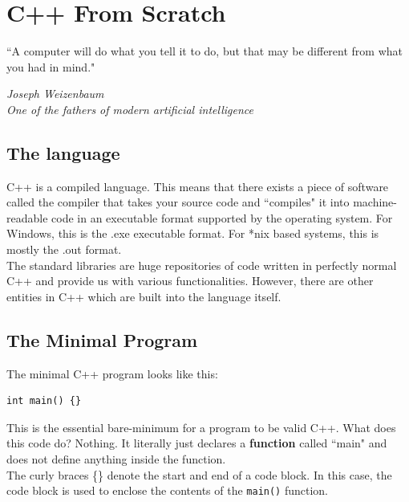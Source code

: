 \documentclass[letterpaper, 12pt]{book}
\begin{document}
\chapter{C++ From Scratch}
\epigraph{\centering ``A computer will do what you tell it to do, but that may be different from what you had in mind."}{\textit{Joseph Weizenbaum \\ One of the fathers of modern artificial intelligence}}
\section{The language}
C++ is a compiled language. This means that there exists a piece of software called the compiler that takes your source code and ``compiles" it into machine-readable code in an executable format supported by the operating system. For Windows, this is the .exe executable format. For *nix based systems, this is mostly the .out format.\\
The standard libraries are huge repositories of code written in perfectly normal C++ and provide us with various functionalities. However, there are other entities in C++ which are built into the language itself.\\
\section{The Minimal Program}
The minimal C++ program looks like this:\\
\begin{lstlisting}
int main() {}
\end{lstlisting}
This is the essential bare-minimum for a program to be valid C++. What does this code do? Nothing. It literally just declares a \textbf{function} called ``main" and does not define anything inside the function.\\
The curly braces \{\} denote the start and end of a code block. In this case, the code block is used to enclose the contents of the \lstinline{main()} function. 
\end{document}
